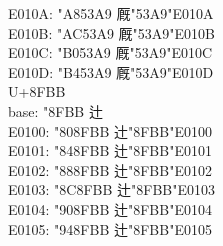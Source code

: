 \documentclass{ujarticle}
\begin{document}
\begin{multicols*}{4}
E010A: \kchar"A853A9 厩󠄊\kchar"53A9\kchar"E010A\\
E010B: \kchar"AC53A9 厩󠄋\kchar"53A9\kchar"E010B\\
E010C: \kchar"B053A9 厩󠄌\kchar"53A9\kchar"E010C\\
E010D: \kchar"B453A9 厩󠄍\kchar"53A9\kchar"E010D\\
\VS
U+8FBB\\
base: \kchar"8FBB 辻\\
E0100: \kchar"808FBB 辻󠄀\kchar"8FBB\kchar"E0100\\
E0101: \kchar"848FBB 辻󠄁\kchar"8FBB\kchar"E0101\\
E0102: \kchar"888FBB 辻󠄂\kchar"8FBB\kchar"E0102\\
E0103: \kchar"8C8FBB 辻󠄃\kchar"8FBB\kchar"E0103\\
E0104: \kchar"908FBB 辻󠄄\kchar"8FBB\kchar"E0104\\
E0105: \kchar"948FBB 辻󠄅\kchar"8FBB\kchar"E0105\\


\end{multicols*}
\end{document}
